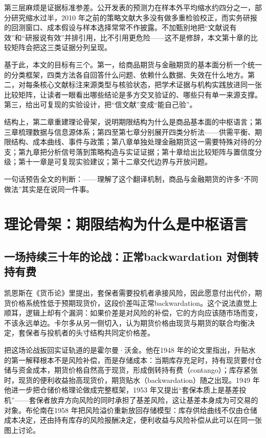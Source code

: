 \documentclass[12pt,a4paper]{ctexart}
\begin{document}
第三层麻烦是证据标准参差。公开发表的预测力在样本外平均缩水约四分之一，部分研究缩水过半\cite{101}，2010 年之前的策略文献大多没有做多重检验校正\cite{98}，而实务研报的回测窗口、成本假设与样本选择常常不作披露。不加甄别地把“文献说有效”和“研报说有效”并排引用，比不引用更危险——这不是修辞，本文第十章的比较矩阵会把这三类证据分列呈现。

基于此，本文的目标有三个。第一，给商品期货与金融期货的基本面分析一个统一的分类框架，四类方法各自回答什么问题、依赖什么数据、失效在什么地方。第二，对每条核心文献标注来源类型与核验状态，把学术证据与机构实践放进同一张比较矩阵，让读者一眼看出哪些结论是多方交叉验证的、哪些只有单一来源支撑。第三，给出可复现的实验设计，把“信文献”变成“能自己验”。

结构上，第二章重建理论骨架，说明期限结构为什么是商品基本面的中枢语言；第三章梳理数据与信息源体系；第四至第七章分别展开四类分析法——供需平衡、期限结构、成本曲线、事件与政策；第八章单独处理金融期货这一需要特殊对待的分支；第九章把分析信号落到策略构造与实证证据；第十章给出比较矩阵与置信度分级；第十一章是可复现实验建议；第十二章交代边界与开放问题。

一句话预告全文的判断：——理解了这个翻译机制，商品与金融期货的许多“不同做法”其实是在说同一件事。

\section{理论骨架：期限结构为什么是中枢语言}

\subsection{一场持续三十年的论战：正常backwardation 对倒转持有费}

凯恩斯在《货币论》里提出，套保者需要投机者承接风险，因此愿意付出代价，期货价格系统性低于预期现货价，这段价差叫正常backwardation\cite{01}。这个说法直觉上顺耳，逻辑上却有个漏洞：如果价差是对风险的补偿，它的方向应该随市场而变，不该永远单边。卡尔多从另一侧切入，认为期货价格由现货与期货的联合均衡决定，套保者与投机者的头寸结构共同定价格差\cite{05}。

把这场论战扳回实证轨道的是霍尔曼·沃金。他在1948 年的论文里指出，升贴水的第一解释根本不是风险补偿，而是存储成本：当期库存充足时，持有现货要付仓储与资金成本，期货价格自然高于现货，形成倒转持有费（contango）；库存紧张时，现货的便利收益抬高现货价，期货贴水（backwardation）随之出现\cite{02}。1949 年他进一步把仓储价格理论做成完整框架，1953 年又提出“套保本质上是基差投机”——套保者放弃方向风险的同时承担了基差风险，这让基差本身成为可交易的对象\cite{03, 04}。布伦南在1958 年把风险溢价重新放回存储模型：库存供给曲线不仅由仓储成本决定，还由持有库存的风险报酬决定，便利收益与风险补偿从此可以在同一张图上讨论\cite{06}。
\end{document}
